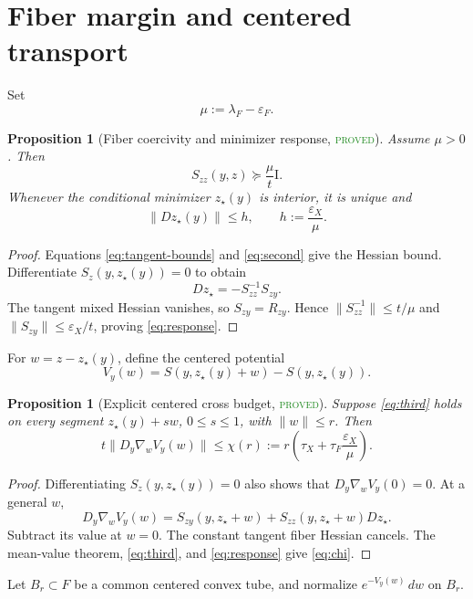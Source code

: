 \documentclass[11pt]{article}
\newtheorem{proposition}[theorem]{Proposition}
\theoremstyle{definition}
\newcommand{\Id}{\mathrm I}
\newcommand{\statusproved}{\textcolor{ForestGreen}{\textsc{proved}}}
\begin{document}
\section{Fiber margin and centered transport}

Set
\begin{equation}\label{eq:mu}
 \mu:=\lambda_F-\varepsilon_F.
\end{equation}

\begin{proposition}[Fiber coercivity and minimizer response, \statusproved]
\label{prop:minimizer}
Assume $\mu>0$.  Then
\[
 S_{zz}(y,z)\succeq\frac{\mu}{t}\Id.
\]
Whenever the conditional minimizer $z_\star(y)$ is interior, it is unique and
\begin{equation}\label{eq:response}
 \|Dz_\star(y)\|\le h,
 \qquad h:=\frac{\varepsilon_X}{\mu}.
\end{equation}
\end{proposition}
\begin{proof}
Equations \eqref{eq:tangent-bounds} and \eqref{eq:second} give the Hessian
bound.  Differentiate $S_z(y,z_\star(y))=0$ to obtain
\[
 Dz_\star=-S_{zz}^{-1}S_{zy}.
\]
The tangent mixed Hessian vanishes, so $S_{zy}=R_{zy}$.  Hence
$\|S_{zz}^{-1}\|\le t/\mu$ and $\|S_{zy}\|\le\varepsilon_X/t$, proving
\eqref{eq:response}.
\end{proof}

For $w=z-z_\star(y)$, define the centered potential
\[
 V_y(w)=S(y,z_\star(y)+w)-S(y,z_\star(y)).
\]

\begin{proposition}[Explicit centered cross budget, \statusproved]
\label{prop:cross}
Suppose \eqref{eq:third} holds on every segment
$z_\star(y)+sw$, $0\le s\le1$, with $\|w\|\le r$.  Then
\begin{equation}\label{eq:chi}
 t\|D_y\nabla_wV_y(w)\|
 \le \chi(r):=r\left(\tau_X+\tau_F
 \frac{\varepsilon_X}{\mu}\right).
\end{equation}
\end{proposition}
\begin{proof}
Differentiating $S_z(y,z_\star(y))=0$ also shows that
$D_y\nabla_wV_y(0)=0$.  At a general $w$,
\[
 D_y\nabla_wV_y(w)=S_{zy}(y,z_\star+w)
 +S_{zz}(y,z_\star+w)Dz_\star.
\]
Subtract its value at $w=0$.  The constant tangent fiber Hessian cancels.
The mean-value theorem, \eqref{eq:third}, and \eqref{eq:response} give
\eqref{eq:chi}.
\end{proof}

Let $B_r\subset F$ be a common centered convex tube, and normalize
$e^{-V_y(w)}\,dw$ on $B_r$.
\end{document}
